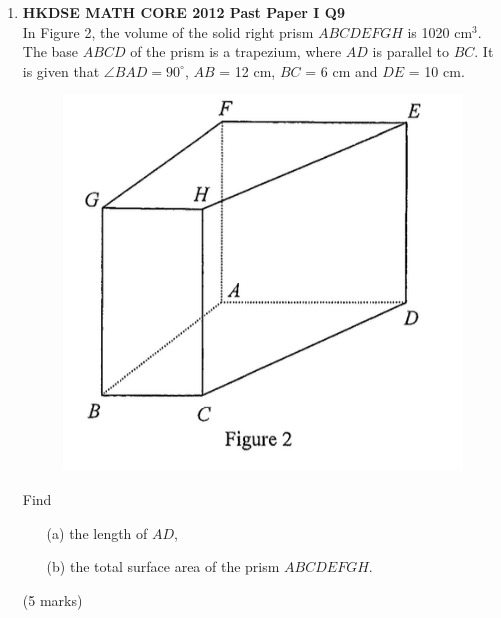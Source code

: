 \documentclass[12pt]{article}
\begin{document}
\begin{enumerate}
	\item \textbf{HKDSE MATH CORE 2012 Past Paper I Q9}\\
	In Figure 2, the volume of the solid right prism $ABCDEFGH$ is 1020 cm$^{3}$. The base $ABCD$ of the prism is a trapezium, where $AD$ is parallel to $BC$. It is given that $\angle BAD = 90^{\circ} $, $AB$ = 12 cm, $BC$ = 6 cm and $DE$ = 10 cm.
	\begin{figure}[H]
		\centering
		\includegraphics[width = .3\linewidth]{2012Figure1.2}
	\end{figure}
	Find
	\begin{enumerate}
		\item[(a)] the length of $AD$,
		\item[(b)] the total surface area of the prism $ABCDEFGH$.
	\end{enumerate}
	(5 marks)


\end{enumerate}
\end{document}
